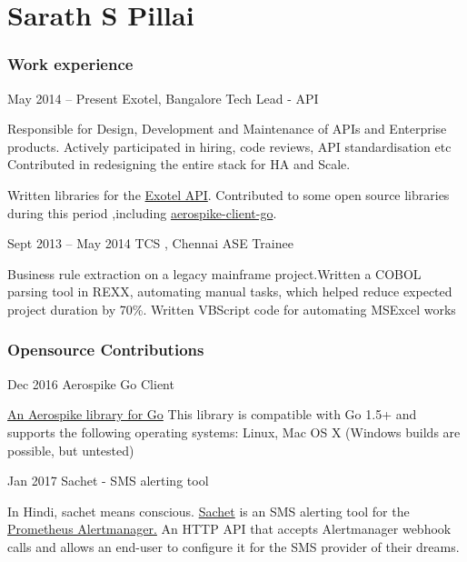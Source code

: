 \documentclass{tccv}
\begin{document}
\part{Sarath S Pillai}

\section{Work experience}

\begin{eventlist}

\item{May 2014 -- Present}
     {Exotel, Bangalore}
     {Tech Lead - API}
     
Responsible for Design, Development and Maintenance of APIs and Enterprise products. 
Actively participated in hiring, code reviews, API standardisation  etc
Contributed in redesigning the entire stack for HA and Scale.

Written libraries for the \href{https://pypi.python.org/pypi/exotel}{Exotel API}.
Contributed to some open source libraries during this period ,including  \href{https://github.com/aerospike/aerospike-client-go}{aerospike-client-go}.


\item{Sept 2013 -- May 2014}
     {TCS , Chennai}
     {ASE Trainee}

Business rule extraction on a legacy mainframe project.Written a COBOL parsing tool in REXX, automating manual tasks, which helped reduce expected project duration by 70\%. Written VBScript 
code for automating MSExcel  works

\end{eventlist}


\section{Opensource Contributions}

\begin{eventlist}
\item{Dec 2016}{ }{Aerospike Go Client}
     
\href{https://github.com/aerospike/aerospike-client-go}{An Aerospike library for Go}
This library is compatible with Go 1.5+ and supports the following operating systems: Linux, Mac OS X (Windows builds are possible, but untested) 

\item{Jan 2017}{  } {Sachet - SMS alerting tool}
     
In Hindi, sachet means conscious.
\href{https://github.com/messagebird/sachet}{Sachet} is an SMS alerting tool for the
\href{https://github.com/prometheus/alertmanager}{Prometheus Alertmanager.}
An HTTP API that accepts Alertmanager webhook calls and allows an end-user to configure it for the SMS provider of their dreams.
\end{eventlist}
\end{document}
